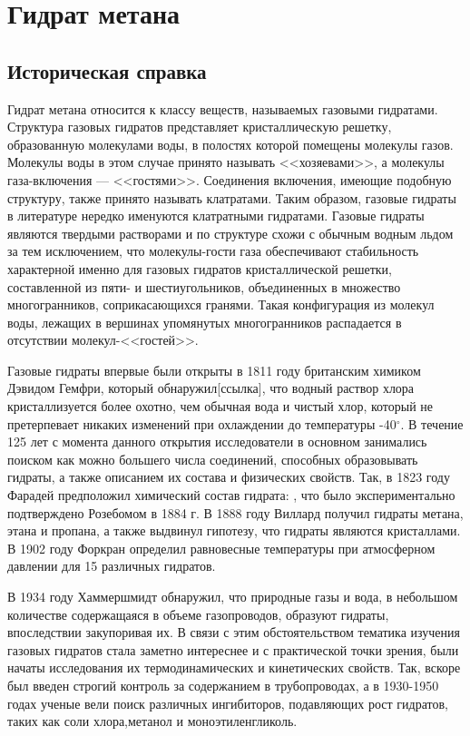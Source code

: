 \chapter{Гидрат метана}
\section{Историческая справка}
\par Гидрат метана относится к классу веществ, называемых газовыми гидратами. Структура газовых гидратов представляет кристаллическую решетку, образованную молекулами воды, в полостях которой помещены молекулы газов. Молекулы воды в этом случае принято называть <<хозяевами>>, а молекулы газа-включения --- <<гостями>>. Соединения включения, имеющие подобную структуру, также принято называть клатратами. Таким образом, газовые гидраты в литературе нередко именуются клатратными гидратами. Газовые гидраты являются твердыми растворами и по структуре схожи с обычным водным льдом за тем исключением, что молекулы-гости газа обеспечивают стабильность характерной именно для газовых гидратов кристаллической решетки, составленной из пяти- и шестиугольников, объединенных в множество многогранников, соприкасающихся гранями. Такая конфигурация из молекул воды, лежащих в вершинах упомянутых многогранников распадается в отсутствии молекул-<<гостей>>.
\par Газовые гидраты впервые были открыты в 1811 году британским химиком Дэвидом Гемфри, который обнаружил[ссылка], что водный раствор хлора кристаллизуется более охотно, чем обычная вода и чистый хлор, который не претерпевает никаких изменений при охлаждении до температуры -40$^{\circ}$. В течение 125 лет с момента данного открытия исследователи в основном занимались поиском как можно большего числа соединений, способных образовывать гидраты, а также описанием их состава и физических свойств. Так, в 1823 году Фарадей предположил химический состав гидрата: , что было экспериментально подтверждено Розебомом в 1884 г. В 1888 году Виллард получил гидраты метана, этана и пропана, а также выдвинул гипотезу, что гидраты являются кристаллами. В 1902 году Форкран определил равновесные температуры при атмосферном давлении для 15 различных гидратов.

\par В 1934 году Хаммершмидт обнаружил, что природные газы и вода, в небольшом количестве содержащаяся в объеме газопроводов, образуют гидраты, впоследствии закупоривая их. В связи с этим обстоятельством тематика изучения газовых гидратов стала заметно интереснее и с практической точки зрения, были начаты исследования их термодинамических и кинетических свойств. Так, вскоре был введен строгий контроль за содержанием  в трубопроводах, а в 1930-1950 годах ученые вели поиск различных ингибиторов, подавляющих рост гидратов, таких как соли хлора,метанол и моноэтиленгликоль.

